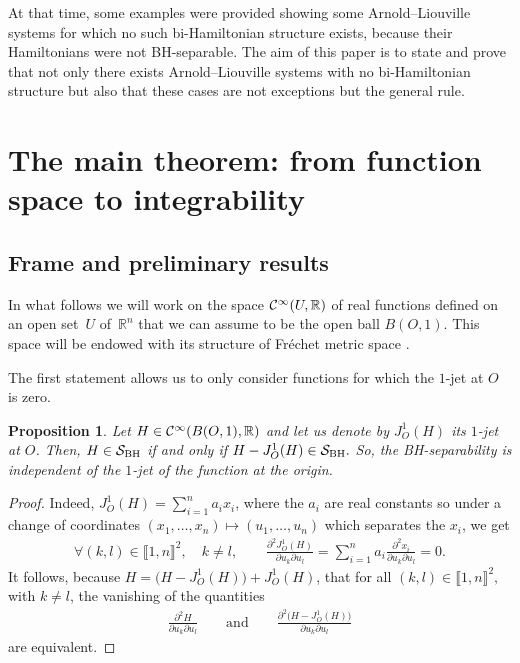 \documentclass[10pt,a4paper]{amsart}
\numberwithin{equation}{section}
\newtheorem{Proposition}[Theorem]{Proposition}
 { \theoremstyle{definition}
\newtheorem{Remark}[Theorem]{Remark} }
\begin{document}
At that time, some examples were provided \cite{Br,BrMoTu,Fe} showing some Arnold--Liouville systems for which no such bi-Hamiltonian structure exists, because their Hamiltonians were not BH-separable. The aim of this paper is to state and prove that not only there exists Arnold--Liouville systems with no bi-Hamiltonian structure but also that these cases are not exceptions but the general rule.

\section{The main theorem: from function space to integrability }

\subsection{Frame and preliminary results}

In what follows we will work on the space ${\cal C}^{\infty}(U,\mathbb{R})$ of real functions defined on an open set~$U$ of~$\mathbb{R}^n$ that we can assume to be the open ball $B(O,1)$. This space will be endowed with its structure of Fr\'echet metric space \cite{Hi}.

The first statement allows us to only consider functions for which the $1$-jet at $O$ is zero.

\begin{Proposition}
	Let $H\in{\cal C}^{\infty}(B(O,1),\mathbb{R})$ and let us denote by $J_O^1(H)$ its $1$-jet at $O$. Then,
	$H\in{\cal S}_{\rm BH}$ if and only if $H-J_O^1(H)\in{\cal S}_{\rm BH}.$
	So, the BH-separability is independent of the $1$-jet of the function at the origin.
\end{Proposition}

\begin{proof}
	Indeed, $J_O^1(H)=\sum_{i=1}^na_ix_i$, where the $a_i$ are real constants so under a change of coordinates $(x_1,\dots,x_n)\mapsto(u_1,\dots,u_n)$ which separates the $x_i$, we get
\begin{gather*}
\forall (k,l)\in\llbracket 1,n\rrbracket^2, \quad k\not=l,\qquad
\frac{\partial^2 J_O^1(H)}{\partial u_k\partial u_l}
=\sum_{i=1}^na_i\frac{\partial^2 x_i}{\partial u_k\partial u_l}=0.
\end{gather*}
	It follows, because $H=\big(H-J_O^1(H)\big)+J_O^1(H)$, that
	for all	$(k,l)\in\llbracket 1,n\rrbracket^2,$ with $k\not=l$, the vanishing of the quantities
\begin{gather*}
\frac{\partial^2 H}{\partial u_k\partial u_l}\qquad \text{and}\qquad \frac{\partial^2 \big(H-J_O^1(H)\big)}{\partial u_k\partial u_l}
\end{gather*}
are equivalent.	
\end{proof}
\end{document}
